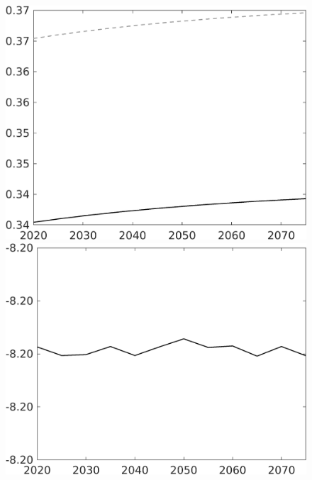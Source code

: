 \documentclass[12pt]{article}
\begin{document}
\begin{figure}[h!!]
\begin{minipage}[]{0.32\textwidth}
	\end{minipage}	
	\begin{minipage}[]{0.32\textwidth}
		\includegraphics[width=1\textwidth]{../../codding_model/own_basedOnFried/optimalPol_010922_revision/figures/all_13Sept22/CompTaul_LFBAU_Reg0_Ln_spillover0_nsk1_xgr0_knspil1_sep1_countec0_GovRev0_etaa0.79_lgd0.png}
	\end{minipage}	
	\begin{minipage}[]{0.32\textwidth}
		\includegraphics[width=1\textwidth]{../../codding_model/own_basedOnFried/optimalPol_010922_revision/figures/all_13Sept22/CompTaul_LFBAUPer_Reg0_Lf_spillover0_nsk1_xgr0_knspil1_sep1_countec0_GovRev0_etaa0.79.png}

\end{minipage}
\end{figure}
\end{document}
